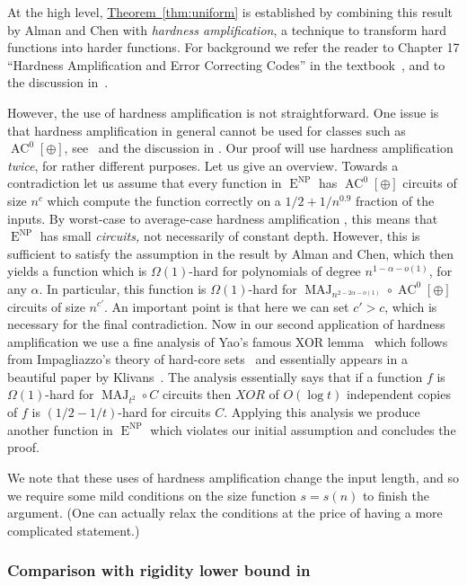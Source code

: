 \documentclass[11pt]{article}
\newcommand{\expref}[2]{\texorpdfstring{\hyperref[#2]{#1~\ref{#2}}}{#1~\ref{#2}}}
\DeclareMathOperator{\MAJ}{\mathrm{MAJ}}  %
\DeclareMathOperator{\AC}{\mathrm{AC}}  %
\DeclareMathOperator{\NP}{\mathrm{NP}}  %
\DeclareMathOperator{\EEE}{\mathrm{E}}  %
\begin{document}
At the high level, \expref{Theorem}{thm:uniform} is established by combining
this result by Alman and Chen with \emph{hardness amplification},
a technique to transform hard functions into harder functions. For
background we refer the reader to Chapter 17 ``Hardness Amplification
and Error Correcting Codes'' in the textbook~\cite{SanjeevBarak2007},
and to the discussion in~\cite{ShV-dec}.

However, the use of hardness amplification is not straightforward.
One issue is that hardness amplification in general cannot be used
for classes such as $\AC^{0}[\oplus]$, see~\cite{GrinbergSV-adaptivemajority}
and the discussion in \cite{ShV-dec,Viola-PhDthesis-journal-hack}.
Our proof will use hardness amplification \emph{twice}, for rather
different purposes. Let us give an overview. Towards a contradiction
let us assume that every function in $\EEE^{\NP}$ has $\AC^{0}[\oplus]$
circuits of size $n^{c}$ which compute the function correctly on
a $1/2+1/n^{0.9}$ fraction of the inputs. By worst-case to average-case
hardness amplification %
\cite{BFNW93,Imp95,STV01}, %
%
this means
that $\EEE^{\NP}$ has small \emph{circuits, }not necessarily of constant
depth. However, this is sufficient to satisfy the assumption in the
result by Alman and Chen, which then yields a function which is $\Omega(1)$-hard
for polynomials of degree $n^{1-\alpha-o(1)}$, for any $\alpha$.
In particular, this function is $\Omega(1)$-hard for $\MAJ_{n^{2-2\alpha-o(1)}}\circ \AC^{0}[\oplus]$
circuits of size $n^{c'}$. An important point is that here we can
set $c'>c$, which is necessary for the final contradiction. Now in
our second application of hardness amplification we use a fine analysis
of Yao's famous XOR lemma~\cite{GNW95} which follows from Impagliazzo's
theory of hard-core sets~\cite{Imp95} and essentially appears in
a beautiful paper by Klivans~\cite{Kli01}. The analysis essentially
says that if a function $f$ is $\Omega(1)$-hard for $\MAJ_{t^{2}}\circ C$
circuits then $XOR$ of $O(\log t)$ independent copies of $f$ is
$(1/2-1/t)$-hard for circuits $C$. Applying this analysis we produce
another function in $\EEE^{\NP}$ which violates our initial assumption
and concludes the proof.

We note that these uses of hardness amplification change the input
length, and so we require some mild conditions on the size function
$s=s(n)$ to finish the argument. (One can actually relax the conditions
at the price of having a more complicated statement.)

\subsubsection{Comparison with rigidity lower bound in~\cite{AlmanC19}}
\end{document}
